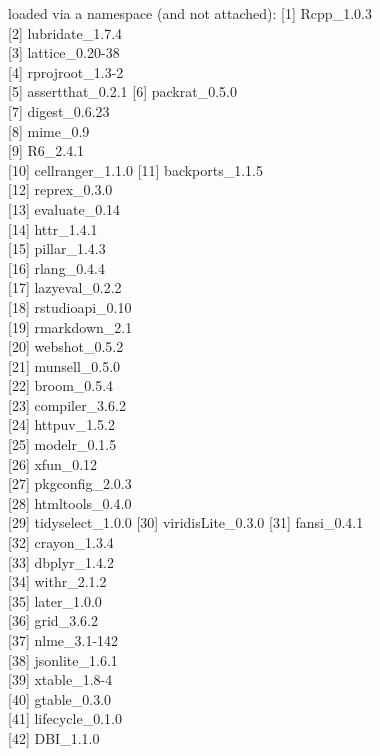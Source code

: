 \documentclass[]{article}
\begin{document}
loaded via a namespace (and not attached): {[}1{]} Rcpp\_1.0.3\\
{[}2{]} lubridate\_1.7.4\\
{[}3{]} lattice\_0.20-38\\
{[}4{]} rprojroot\_1.3-2\\
{[}5{]} assertthat\_0.2.1 {[}6{]} packrat\_0.5.0\\
{[}7{]} digest\_0.6.23\\
{[}8{]} mime\_0.9\\
{[}9{]} R6\_2.4.1\\
{[}10{]} cellranger\_1.1.0 {[}11{]} backports\_1.1.5\\
{[}12{]} reprex\_0.3.0\\
{[}13{]} evaluate\_0.14\\
{[}14{]} httr\_1.4.1\\
{[}15{]} pillar\_1.4.3\\
{[}16{]} rlang\_0.4.4\\
{[}17{]} lazyeval\_0.2.2\\
{[}18{]} rstudioapi\_0.10\\
{[}19{]} rmarkdown\_2.1\\
{[}20{]} webshot\_0.5.2\\
{[}21{]} munsell\_0.5.0\\
{[}22{]} broom\_0.5.4\\
{[}23{]} compiler\_3.6.2\\
{[}24{]} httpuv\_1.5.2\\
{[}25{]} modelr\_0.1.5\\
{[}26{]} xfun\_0.12\\
{[}27{]} pkgconfig\_2.0.3\\
{[}28{]} htmltools\_0.4.0\\
{[}29{]} tidyselect\_1.0.0 {[}30{]} viridisLite\_0.3.0 {[}31{]}
fansi\_0.4.1\\
{[}32{]} crayon\_1.3.4\\
{[}33{]} dbplyr\_1.4.2\\
{[}34{]} withr\_2.1.2\\
{[}35{]} later\_1.0.0\\
{[}36{]} grid\_3.6.2\\
{[}37{]} nlme\_3.1-142\\
{[}38{]} jsonlite\_1.6.1\\
{[}39{]} xtable\_1.8-4\\
{[}40{]} gtable\_0.3.0\\
{[}41{]} lifecycle\_0.1.0\\
{[}42{]} DBI\_1.1.0\\
\end{document}
